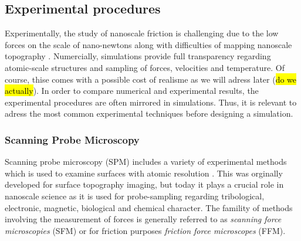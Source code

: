 



\subsection{Experimental procedures}

Experimentally, the study of nanoscale friction is challenging due to the low forces on the scale of nano-newtons along with difficulties of mapping nanoscale topography \cite[p. ?]{gnecco_meyer_2015}. Numercially, simulations provide full transparency regarding atomic-scale structures and sampling of forces, velocities and temperature. Of course, thise comes with a possible cost of realisme as we will adress later (\hl{do we actually}). In order to compare numerical and experimental results, the experimental procedures are often mirrored in simulations. Thus, it is relevant to adress the most common experimental techniques before designing a simulation. 


\subsubsection{Scanning Probe Microscopy}\label{sec:SPM}
Scanning probe microscopy (SPM) includes a variety of experimental methods which
is used to examine surfaces with atomic resolution \cite[p.
6-?]{BHUSHAN20051507}. This was orginally developed for surface topography
imaging, but today it plays a crucial role in nanoscale science as it is used
for probe-sampling regarding tribological, electronic, magnetic, biological and
chemical character. The famility of methods involving the measurement of forces
is generally referred to as \textit{scanning force microscopies} (SFM) or for friction purposes \textit{friction force microscopes} (FFM).

